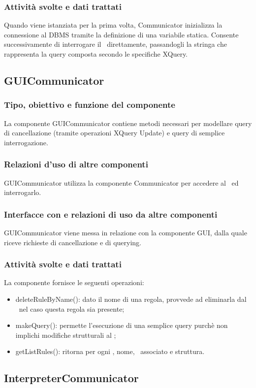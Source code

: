 \documentclass[11pt,titlepage,a4paper]{report}
\begin{document}
\subsubsection{Attivit\`a svolte e dati trattati}
Quando viene istanziata per la prima volta, Communicator inizializza la connessione al DBMS tramite la definizione di una variabile statica. Consente successivamente di interrogare il \re\ direttamente, passandogli la stringa che rappresenta la query composta secondo le specifiche XQuery.
%
\subsection{GUICommunicator}
\subsubsection{Tipo, obiettivo e funzione del componente}
La componente GUICommunicator contiene metodi necessari per modellare query di cancellazione (tramite operazioni XQuery Update) e query di semplice interrogazione.
\subsubsection{Relazioni d'uso di altre componenti}
GUICommunicator utilizza la componente Communicator per accedere al \re\ ed interrogarlo.
\subsubsection{Interfacce con e relazioni di uso da altre componenti}
GUICommunicator viene messa in relazione con la componente GUI, dalla quale riceve richieste di cancellazione e di querying.
\subsubsection{Attivit\`a svolte e dati trattati}
La componente fornisce le seguenti operazioni:
\begin{itemize}
 \item deleteRuleByName(): dato il nome di una regola, provvede ad eliminarla dal \re\ nel caso questa regola sia presente;
 \item makeQuery(): permette l'esecuzione di una semplice query purch\`e non implichi modifiche strutturali al \re;
 \item getListRules(): ritorna per ogni \br, nome, \bo\ associato e struttura.
\end{itemize}
\subsection{InterpreterCommunicator}
\end{document}
